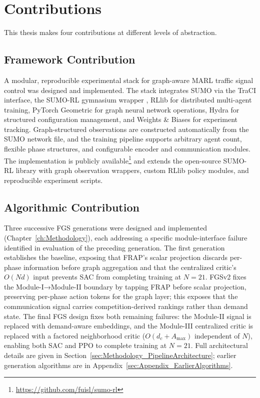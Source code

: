 \section{Contributions}
\label{sec:ConclusionFutureWork_Contributions}

This thesis makes four contributions at different levels of abstraction.

\subsection{Framework Contribution}
\label{sec:ConclusionFutureWork_FrameworkContribution}

A modular, reproducible experimental stack for graph-aware MARL traffic signal control was designed and implemented. The stack integrates SUMO \citep{lopez2018microscopic} via the TraCI interface, the SUMO-RL gymnasium wrapper \citep{alegre2021sumorl}, RLlib for distributed multi-agent training, PyTorch Geometric for graph neural network operations, Hydra for structured configuration management, and Weights \& Biases \citep{wandb} for experiment tracking. Graph-structured observations are constructed automatically from the SUMO network file, and the training pipeline supports arbitrary agent count, flexible phase structures, and configurable encoder and communication modules. The implementation is publicly available\footnote{\url{https://github.com/fuisl/sumo-rl}} and extends the open-source SUMO-RL library with graph observation wrappers, custom RLlib policy modules, and reproducible experiment scripts.

\subsection{Algorithmic Contribution}
\label{sec:ConclusionFutureWork_AlgorithmicContribution}

Three successive FGS generations were designed and implemented (Chapter~\ref{ch:Methodology}), each addressing a specific module-interface failure identified in evaluation of the preceding generation. The first generation establishes the baseline, exposing that FRAP's scalar projection discards per-phase information before graph aggregation and that the centralized critic's $O(Nd)$ input prevents SAC from completing training at $N=21$. FGSv2 fixes the Module-I→Module-II boundary by tapping FRAP before scalar projection, preserving per-phase action tokens for the graph layer; this exposes that the communication signal carries competition-derived rankings rather than demand state. The final FGS design fixes both remaining failures: the Module-II signal is replaced with demand-aware embeddings, and the Module-III centralized critic is replaced with a factored neighborhood critic ($O(d_c + A_{\max})$ independent of $N$), enabling both SAC and PPO to complete training at $N=21$. Full architectural details are given in Section~\ref{sec:Methodology_PipelineArchitecture}; earlier generation algorithms are in Appendix~\ref{sec:Appendix_EarlierAlgorithms}.

